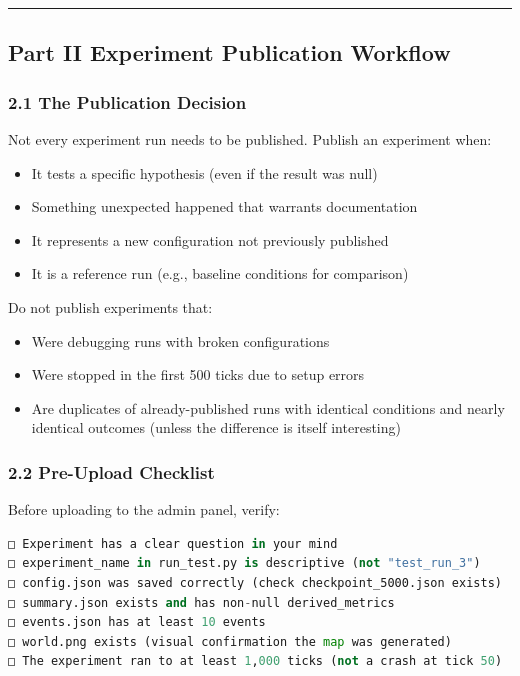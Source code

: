 \documentclass[11pt,a4paper]{article}
\begin{document}
\noindent\rule{\textwidth}{0.4pt}

\subsection*{Part II  Experiment Publication Workflow}

\subsubsection*{2.1 The Publication Decision}

Not every experiment run needs to be published. Publish an experiment when:

\begin{itemize}
  \item It tests a specific hypothesis (even if the result was null)
  \item Something unexpected happened that warrants documentation
  \item It represents a new configuration not previously published
  \item It is a reference run (e.g., baseline conditions for comparison)
\end{itemize}

Do not publish experiments that:
\begin{itemize}
  \item Were debugging runs with broken configurations
  \item Were stopped in the first 500 ticks due to setup errors
  \item Are duplicates of already-published runs with identical conditions and nearly identical outcomes (unless the difference is itself interesting)
\end{itemize}

\subsubsection*{2.2 Pre-Upload Checklist}

Before uploading to the admin panel, verify:

\begin{lstlisting}[language=Python]
□ Experiment has a clear question in your mind
□ experiment_name in run_test.py is descriptive (not "test_run_3")
□ config.json was saved correctly (check checkpoint_5000.json exists)
□ summary.json exists and has non-null derived_metrics
□ events.json has at least 10 events
□ world.png exists (visual confirmation the map was generated)
□ The experiment ran to at least 1,000 ticks (not a crash at tick 50)
\end{lstlisting}
\end{document}

